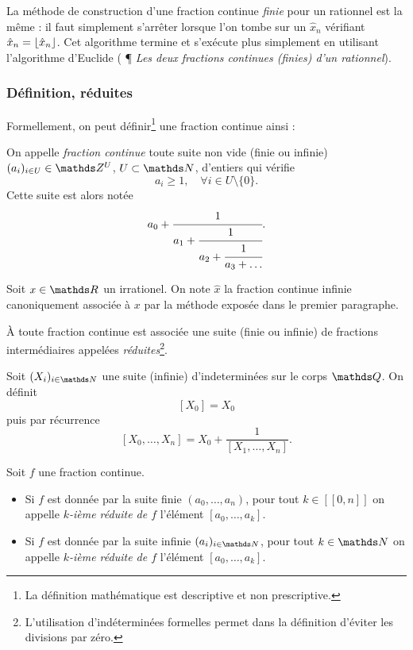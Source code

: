\begin{remarque}
	La méthode de construction d'une fraction continue \emph{finie} pour un
	rationnel est la même : il faut simplement s'arrêter lorsque l'on tombe sur
	un $\hat{x}_n$ vérifiant $\hat{x}_n = \lfloor\hat{x}_n\rfloor$. Cet algorithme
	termine et s'exécute plus simplement en utilisant l'algorithme d'Euclide
	(\cite{wikiu} ¶ \emph{Les deux fractions continues (finies) d'un rationnel}).
\end{remarque}

\subsubsection{Définition, réduites}

Formellement, on peut définir\footnote{La définition mathématique est
descriptive et non prescriptive.} une fraction continue ainsi :

\begin{definition}\label{def-fracont}
	On appelle \emph{fraction continue} toute suite non vide (finie ou infinie)
	$(a_i)_{i\in U} \in \Z^U$, $U\subset \N$, d'entiers qui vérifie \[a_i
	\geq 1, \quad \forall i\in U\setminus\{0\}.\] Cette suite est alors notée
	\[a_0 + \cfrac{1}{a_1 + \cfrac{1}{a_2 + \cfrac{1}{a_3 + \dots}}}.\]
\end{definition}

\begin{notation}
	Soit $x\in \R$ un irrationel. On note $\hat{x}$ la fraction continue
	infinie canoniquement associée à $x$ par la méthode exposée dans le premier
	paragraphe.
\end{notation}

À toute fraction continue est associée une suite (finie ou infinie) de
fractions \og intermédiaires \fg{} appelées
\emph{réduites}\footnote{L'utilisation d'indéterminées formelles permet dans la
définition d'éviter les divisions par zéro.}.

\begin{definition}
	Soit $(X_i)_{i\in \N}$ une suite (infinie) d'indeterminées sur le corps
	$\Q$. On définit \[[X_0] = X_0\] puis par récurrence \[[X_0, \dots,
	X_n] = X_0 + \frac{1}{[X_1, \dots, X_n]}.\]
\end{definition}

\begin{definition}
	Soit $f$ une fraction continue.
	\begin{itemize}
		\item Si $f$ est donnée par la suite finie $(a_0, \dots, a_n)$, pour
		tout $k\in [\![0, n]\!]$ on appelle \emph{$k$-ième réduite de $f$}
		l'élément $[a_0, \dots, a_k]$.
		\item Si $f$ est donnée par la suite infinie $(a_i)_{i\in \N}$, pour
		tout $k\in \N$ on appelle \emph{$k$-ième réduite de $f$} l'élément
		$[a_0, \dots, a_k]$.
	\end{itemize}
\end{definition}

